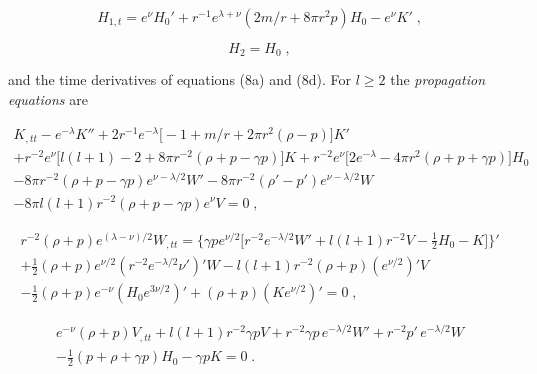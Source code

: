 \begin{equation}
H_{1,t} = e^{\nu}H_0' + r^{-1}e^{\lambda+\nu}(2m/r+8\pi r^2 p)H_0 - e^{\nu}K' \;,
\tag{8c}
\end{equation}

\begin{equation}
H_2 = H_0 \;,
\tag{8d}
\end{equation}

and the time derivatives of equations (8a) and (8d). For $l\geq 2$ the \emph{propagation
equations} are

\begin{equation}
\begin{split}
K_{,tt} - e^{-\lambda}K'' + 2r^{-1}e^{-\lambda}\bigl[-1+m/r+2\pi r^2(\rho-p)\bigr]K' \\
+ r^{-2}e^{\nu}\bigl[l(l+1)-2+8\pi r^{-2}(\rho+p-\gamma p)\bigr]K
  + r^{-2}e^{\nu}\bigl[2e^{-\lambda}-4\pi r^2(\rho+p+\gamma p)\bigr]H_0 \\
- 8\pi r^{-2}(\rho+p-\gamma p)e^{\nu-\lambda/2}W'
  - 8\pi r^{-2}(\rho'-p')e^{\nu-\lambda/2}W \\
- 8\pi l(l+1)r^{-2}(\rho+p-\gamma p)e^{\nu}V = 0 \;,
\end{split}
\tag{9a}
\end{equation}

\begin{equation}
\begin{split}
r^{-2}(\rho+p)e^{(\lambda-\nu)/2}W_{,tt}
  = \bigl\{\gamma p e^{\nu/2}\bigl[r^{-2}e^{-\lambda/2}W'
    + l(l+1)r^{-2}V - \tfrac{1}{2}H_0 - K\bigr]\bigr\}' \\
+ \tfrac{1}{2}(\rho+p)e^{\nu/2}(r^{-2}e^{-\lambda/2}\nu')'W
  - l(l+1)r^{-2}(\rho+p)(e^{\nu/2})'V \\
- \tfrac{1}{2}(\rho+p)e^{-\nu}(H_0 e^{3\nu/2})'
  + (\rho+p)(Ke^{\nu/2})' = 0 \;,
\end{split}
\tag{9b}
\end{equation}

\begin{equation}
\begin{split}
e^{-\nu}(\rho+p)V_{,tt} + l(l+1)r^{-2}\gamma p V
  + r^{-2}\gamma p\,e^{-\lambda/2}W' + r^{-2}p'\,e^{-\lambda/2}W \\
- \tfrac{1}{2}(p+\rho+\gamma p)H_0 - \gamma p K = 0 \;.
\end{split}
\tag{9c}
\end{equation}
